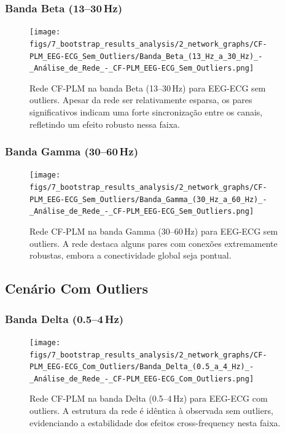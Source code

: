 \subsubsection{\texorpdfstring{Banda Beta (13--30\,Hz)}{Banda Beta (13-30 Hz)}}
\begin{figure}[htb]
  \centering
  \texttt{[image: figs/7\_bootstrap\_results\_analysis/2\_network\_graphs/CF-PLM\_EEG-ECG\_Sem\_Outliers/Banda\_Beta\_(13\_Hz\_a\_30\_Hz)\_-\_Análise\_de\_Rede\_-\_CF-PLM\_EEG-ECG\_Sem\_Outliers.png]}
  \caption{Rede CF-PLM na banda Beta (13--30\,Hz) para EEG-ECG sem outliers. Apesar da rede ser relativamente esparsa, os pares significativos indicam uma forte sincronização entre os canais, refletindo um efeito robusto nessa faixa.}
  \label{fig:rede_cfplm_beta_sem}
\end{figure}

\subsubsection{\texorpdfstring{Banda Gamma (30--60\,Hz)}{Banda Gamma (30-60 Hz)}}
\begin{figure}[htb]
  \centering
  \texttt{[image: figs/7\_bootstrap\_results\_analysis/2\_network\_graphs/CF-PLM\_EEG-ECG\_Sem\_Outliers/Banda\_Gamma\_(30\_Hz\_a\_60\_Hz)\_-\_Análise\_de\_Rede\_-\_CF-PLM\_EEG-ECG\_Sem\_Outliers.png]}
  \caption{Rede CF-PLM na banda Gamma (30--60\,Hz) para EEG-ECG sem outliers. A rede destaca alguns pares com conexões extremamente robustas, embora a conectividade global seja pontual.}
  \label{fig:rede_cfplm_gamma_sem}
\end{figure}

\subsection{Cenário Com Outliers}
\subsubsection{\texorpdfstring{Banda Delta (0.5--4\,Hz)}{Banda Delta (0.5-4 Hz)}}
\begin{figure}[htb]
  \centering
  \texttt{[image: figs/7\_bootstrap\_results\_analysis/2\_network\_graphs/CF-PLM\_EEG-ECG\_Com\_Outliers/Banda\_Delta\_(0.5\_a\_4\_Hz)\_-\_Análise\_de\_Rede\_-\_CF-PLM\_EEG-ECG\_Com\_Outliers.png]}
  \caption{Rede CF-PLM na banda Delta (0.5--4\,Hz) para EEG-ECG com outliers. A estrutura da rede é idêntica à observada sem outliers, evidenciando a estabilidade dos efeitos cross-frequency nesta faixa.}
  \label{fig:rede_cfplm_delta_com}
\end{figure}

